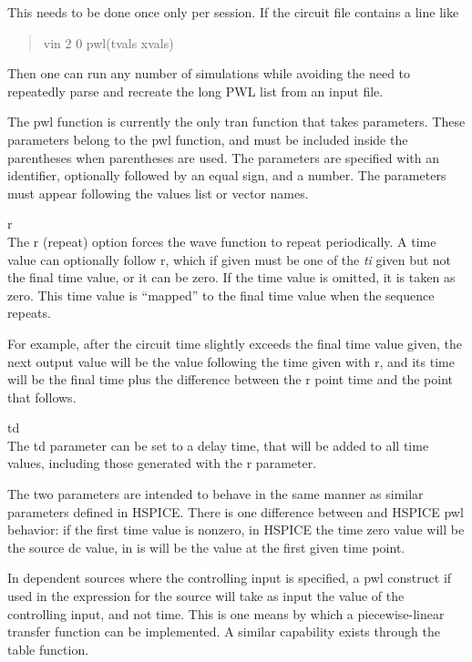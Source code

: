 This needs to be done once only per session.  If the circuit file
contains a line like

\begin{quote}\vt
vin 2 0 pwl(tvals xvals)
\end{quote}

Then one can run any number of simulations while avoiding the need to
repeatedly parse and recreate the long PWL list from an input file.

The {\vt pwl} function is currently the only tran function that takes
parameters.  These parameters belong to the {\vt pwl} function, and
must be included inside the parentheses when parentheses are used. 
The parameters are specified with an identifier, optionally followed
by an equal sign, and a number.  The parameters must appear following
the values list or vector names.

\begin{description}
\item{\vt r}\\
The {\vt r} (repeat) option forces the wave function to repeat
periodically.  A time value can optionally follow {\vt r}, which if
given must be one of the {\it ti} given but not the final time value,
or it can be zero.  If the time value is omitted, it is taken as zero. 
This time value is ``mapped'' to the final time value when the
sequence repeats.
 
For example, after the circuit time slightly exceeds the final time
value given, the next output value will be the value following the time
given with {\vt r}, and its time will be the final time plus the
difference between the {\vt r} point time and the point that follows.

\item{\vt td}\\
The {\vt td} parameter can be set to a delay time, that will be added
to all time values, including those generated with the {\vt r}
parameter.
\end{description}

The two parameters are intended to behave in the same manner as
similar parameters defined in HSPICE.  There is one difference between
{\WRspice} and HSPICE {\vt pwl} behavior:  if the first time value is
nonzero, in HSPICE the time zero value will be the source {\vt dc}
value, in {\WRspice} is will be the value at the first given time
point.
 
In dependent sources where the controlling input is specified, a {\vt
pwl} construct if used in the expression for the source will take as
input the value of the controlling input, and not time.  This is one
means by which a piecewise-linear transfer function can be
implemented.  A similar capability exists through the {\vt table}
function.

